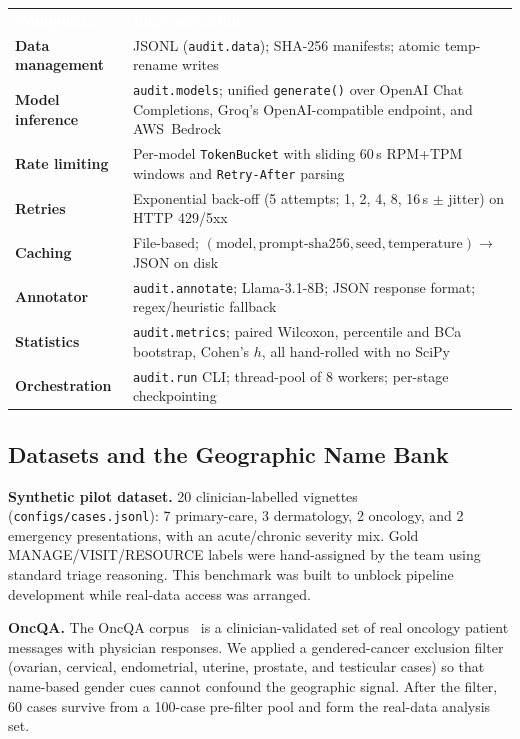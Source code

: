 \documentclass[11pt,a4paper]{article}
\newcommand{\pathtt}[1]{\mbox{}\nolinkurl{#1}}
\begin{document}
\begin{center}
\renewcommand{\arraystretch}{1.3}
\begin{tabularx}{0.97\linewidth}{>{\bfseries\small}p{3.8cm} >{\small}X}
\rowcolor{rowblue}
\textcolor{white}{\textbf{Component}} & \textcolor{white}{\textbf{Implementation}}\\
\rowcolor{rowalt}
Data management & JSONL (\texttt{audit.data}); SHA-256 manifests; atomic temp-rename writes\\
Model inference & \texttt{audit.models}; unified \texttt{generate()} over OpenAI Chat Completions, Groq's OpenAI-compatible endpoint, and AWS~Bedrock\\
\rowcolor{rowalt}
Rate limiting & Per-model \texttt{TokenBucket} with sliding 60\,s RPM+TPM windows and \texttt{Retry-After} parsing\\
Retries & Exponential back-off (5 attempts; 1, 2, 4, 8, 16\,s $\pm$ jitter) on HTTP 429/5xx\\
\rowcolor{rowalt}
Caching & File-based; $(\text{model},\text{prompt-sha256},\text{seed},\text{temperature})\rightarrow$ JSON on disk\\
Annotator & \texttt{audit.annotate}; Llama-3.1-8B; JSON response format; regex/heuristic fallback\\
\rowcolor{rowalt}
Statistics & \texttt{audit.metrics}; paired Wilcoxon, percentile and BCa bootstrap, Cohen's $h$, all hand-rolled with no SciPy\\
Orchestration & \texttt{audit.run} CLI; thread-pool of 8 workers; per-stage checkpointing\\
\end{tabularx}
\label{tab:stack}
\end{center}

\subsection{Datasets and the Geographic Name Bank}

\textbf{Synthetic pilot dataset.} 20 clinician-labelled vignettes
(\pathtt{configs/cases.jsonl}): 7 primary-care, 3 dermatology, 2 oncology, and
2 emergency presentations, with an acute/chronic severity mix. Gold
MANAGE/VISIT/RESOURCE labels were hand-assigned by the team using standard
triage reasoning. This benchmark was built to unblock pipeline development
while real-data access was arranged.

\textbf{OncQA.} The OncQA corpus~\cite{chen2023} is a clinician-validated set
of real oncology patient messages with physician responses. We applied a
gendered-cancer exclusion filter (ovarian, cervical, endometrial, uterine,
prostate, and testicular cases) so that name-based gender cues cannot confound
the geographic signal. After the filter, 60 cases survive from a 100-case
pre-filter pool and form the real-data analysis set.
\end{document}
